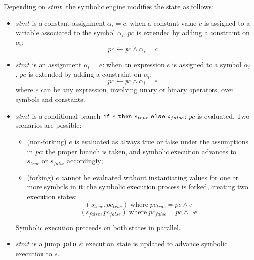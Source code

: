\noindent Depending on $stmt$, the symbolic engine modifies the state as follows:
\begin{itemize}
  \item $stmt$ is a constant assignment $\alpha_i = c$: when a constant value $c$ is assigned to a variable associated to the symbol $\alpha_i$, $pc$ is extended by adding a constraint on $\alpha_i$:
    \[ pc \gets pc \wedge \alpha_i = c\]

  \item $stmt$ is an assignment $\alpha_i = e$: when an expression $e$ is assigned to a symbol $\alpha_i$, $pc$ is extended by adding a constraint on $\alpha_i$:
    \[ pc \gets pc \wedge \alpha_i = e\]
  where $e$ can be any expression, involving unary or binary operators, over symbols and constants.

  \item $stmt $ is a conditional branch ${\tt if}~e~{\tt then}~s_{true}~{\tt else}~s_{false}$: $pc$ is evaluated. Two scenarios are possible:
    \begin{itemize}
      \item (non-forking) $e$ is evaluated as always true or false under the assumptions in $pc$: the proper branch is taken, and symbolic execution advances to $s_{true}$ or $s_{false}$ accordingly;
      \item (forking) $e$ cannot be evaluated without instantiating values for one or more symbols in it: the symbolic execution process is forked, creating two execution states:
        \[ (s_{true}, pc_{true}) \text{ where } pc_{true} = pc \wedge e \]
        \[ (s_{false}, pc_{false}) \text{ where } pc_{false} = pc \wedge \neg e \]
    \end{itemize}
    Symbolic execution proceeds on both states in parallel.

  \item $stmt $ is a jump {\tt goto} $s$: execution state is updated to advance symbolic execution to $s$. 
\end{itemize}


